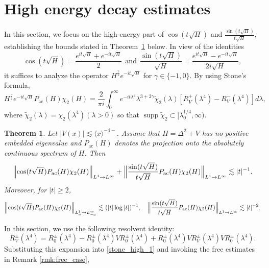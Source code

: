 \documentclass[reqno]{amsart}
\newtheorem{theorem}{Theorem}[section]
\numberwithin{equation}{section}
\begin{document}
\section{High energy decay estimates}\label{sec:high-energy}
In this section, we focus on the high-energy part of $\cos(t\sqrt{H})$ and $\frac{\sin(t\sqrt{H})}{t\sqrt{H}}$, establishing the bounds stated in Theorem~\ref{main_theorem_high} below.
In view of the identities 
\[
	\cos (t \sqrt{H})=\frac{e^{i t \sqrt{H}}+e^{-i t \sqrt{H}}}{2}\ \ \text{and}\ \ \frac{\sin (t \sqrt{H})}{\sqrt{H}}=\frac{e^{i t \sqrt{H}}-e^{-i t \sqrt{H}}}{2i\sqrt{H}},
	\]
   it suffices to analyze the operator $H^{\frac{\gamma}{2}} e^{-it\sqrt{H}}$ for $\gamma \in \{-1, 0\}$.
By using Stone's formula,
\begin{equation}\label{stone_high_1}
  H^{\frac{\gamma}{2}}e^{-i t \sqrt{H}}P_{\mathrm{ac}}(H)\chi_2(H)
= \frac{2}{\pi i} \int_0^{\infty} e^{-it\lambda^2}\lambda^{3+2\gamma} \widetilde{\chi}_2(\lambda) \left[R_V^{+}(\lambda^4)-R_V^{-}(\lambda^4)\right] d \lambda,
\end{equation}
where $\widetilde{\chi}_2(\lambda)=\chi_2(\lambda^4)(\lambda>0)$ so that $\operatorname{supp}\widetilde{\chi}_2 \subset [\lambda_0^{1/4}, \infty)$.
\begin{theorem}\label{main_theorem_high}
Let $|V(x)| \lesssim \langle x \rangle^{-4-}$. Assume that $H=\Delta^2+V$ has no positive embedded eigenvalue and $P_{\mathrm{ac}}(H)$ denotes the projection onto the absolutely continuous spectrum of $H$. Then
$$
\begin{aligned}
\Bigl\|\cos (t \sqrt{H}) P_{\mathrm{ac}}(H)\chi_2(H)\Bigr\|_{L^1\to L^\infty}
+ \Bigl\|\frac{\sin(t\sqrt{H})}{t\sqrt{H}}P_{\mathrm{ac}}(H)\chi_2(H)\Bigr\|_{L^1\to L^\infty}
\lesssim |t|^{-1}.
\end{aligned}
$$
Moreover, for $|t|\ge 2$,
$$
\begin{aligned}
 \Bigl\|\cos (t \sqrt{H}) P_{\mathrm{ac}}(H)\chi_2(H)\Bigr\|_{L^1_\omega\to L^\infty_{-\omega}}
\lesssim ({|t|\log |t|})^{-1}, \quad
\Bigl\|\frac{\sin(t\sqrt{H})}{t\sqrt{H}}P_{\mathrm{ac}}(H)\chi_2(H)\Bigr\|_{L^1\to L^\infty}
\lesssim |t|^{-2}.
\end{aligned}
$$
\end{theorem}
In this section, we use the following resolvent identity:
$$
R_V^{\pm}(\lambda^4)=R_0^{\pm}(\lambda^4)-R_0^{ \pm}(\lambda^4)VR_0^{\pm}(\lambda^4)+R_0^{ \pm}(\lambda^4)VR_V^{\pm}(\lambda^4)VR_0^{ \pm}(\lambda^4).
$$
Substituting this expansion into \eqref{stone_high_1} and 
invoking the free estimates in Remark \ref{rmk:free_case},
\end{document}
